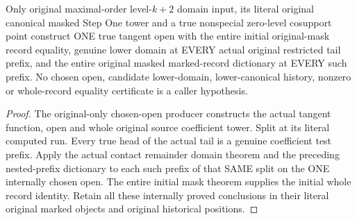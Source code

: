 \begin{theorem}
\label{hir:original-all-level-contact-remainder-computed-whole-prefix-dictionary}
\leanok
{}
Only original maximal-order level-$k+2$ domain input, its literal original
canonical masked Step One tower and a true nonspecial zero-level cosupport
point construct ONE true tangent open with the entire initial original-mask
record equality, genuine lower domain at EVERY actual original restricted tail
prefix, and the entire original masked marked-record dictionary at EVERY such
prefix. No chosen open, candidate lower-domain, lower-canonical history,
nonzero or whole-record equality certificate is a caller hypothesis.
\end{theorem}
\begin{proof}
The original-only chosen-open producer constructs the actual tangent function,
open and whole original source coefficient tower. Split at its literal
computed run. Every true head of the actual tail is a genuine coefficient
test prefix. Apply the actual contact remainder domain theorem and the preceding
nested-prefix dictionary to each such prefix of that SAME split on the ONE
internally chosen open. The entire initial mask theorem supplies the initial
whole record identity. Retain all these internally proved conclusions in their
literal original marked objects and original historical positions.
\end{proof}

